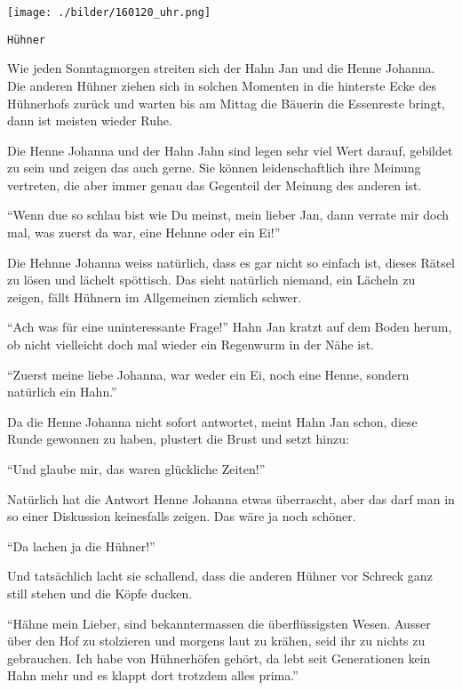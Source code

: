 \thispagestyle{empty}
\begin{center}
\texttt{[image: ./bilder/160120\_uhr.png]}
\end{center}
\vskip 2cm
{\Huge\color{farbe}\hfill{\tt{Hühner}}}
\newpage
\lettrine[lines=2, lhang=.2, loversize=.25, lraise=0.05, findent=0.1em,
nindent=0em]{W}{}ie jeden Sonntagmorgen streiten sich der Hahn Jan und die
Henne Johanna. Die anderen Hühner ziehen sich in solchen Momenten in die
hinterste Ecke des Hühnerhofs zurück und warten bis am Mittag die Bäuerin die
Essenreste bringt, dann ist meisten wieder Ruhe. 

Die Henne Johanna und der Hahn Jahn sind legen sehr viel Wert darauf, gebildet
zu sein und zeigen das auch gerne. Sie können leidenschaftlich ihre Meinung
vertreten, die aber immer genau das Gegenteil der Meinung des anderen ist. 

\enquote{Wenn due so schlau bist wie Du meinst, mein lieber Jan, dann verrate
mir doch mal, was zuerst da war, eine Hehnne oder ein Ei!}

Die Hehnne Johanna weiss natürlich, dass es gar nicht so einfach ist, dieses
Rätsel zu lösen und lächelt spöttisch. Das sieht natürlich niemand, ein Lächeln
zu zeigen, fällt Hühnern im Allgemeinen ziemlich schwer.


\enquote{Ach was für eine uninteressante Frage!} Hahn Jan kratzt auf dem Boden
herum, ob nicht vielleicht doch mal wieder ein Regenwurm in der Nähe ist. 

\enquote{Zuerst meine liebe Johanna, war weder ein Ei, noch eine Henne, sondern natürlich ein Hahn.}

Da die Henne Johanna nicht sofort antwortet, meint Hahn Jan schon, diese Runde
gewonnen zu haben, plustert die Brust und setzt hinzu:


\enquote{Und glaube mir, das waren glückliche Zeiten!}

Natürlich hat die Antwort Henne Johanna etwas überrascht, aber das darf man in
so einer Diskussion keinesfalls zeigen. Das wäre ja noch schöner.

\enquote{Da lachen ja die Hühner!}

Und tatsächlich lacht sie schallend, dass die anderen Hühner vor Schreck ganz
still stehen und die Köpfe ducken.


\enquote{Hähne mein Lieber, sind bekanntermassen die überflüssigsten Wesen.
Ausser über den Hof zu stolzieren und morgens laut zu krähen, seid ihr zu
nichts zu gebrauchen. Ich habe von Hühnerhöfen gehört, da lebt seit
Generationen kein Hahn mehr und es klappt dort trotzdem alles prima.}


